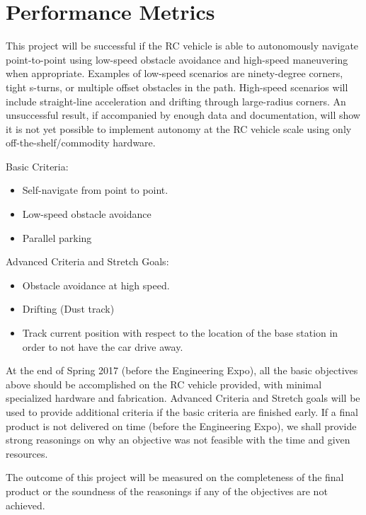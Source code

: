 \documentclass[draftclsnofoot,onecolumn,10pt]{IEEEtran}
\begin{document}
\section{Performance Metrics}
This project will be successful if the RC vehicle is able to autonomously navigate point-to-point using low-speed obstacle avoidance and high-speed maneuvering when appropriate. 
Examples of low-speed scenarios are ninety-degree corners, tight s-turns, or multiple offset obstacles in the path. 
High-speed scenarios will include straight-line acceleration and drifting through large-radius corners. 
An unsuccessful result, if accompanied by enough data and documentation, will show it is not yet possible to implement autonomy at the RC vehicle scale using only off-the-shelf/commodity hardware.\par
Basic Criteria:
\begin{itemize}
	\item Self-navigate from point to point.
	\item Low-speed obstacle avoidance
	\item Parallel parking
\end{itemize}
 Advanced Criteria and Stretch Goals:
 \begin{itemize}
	\item Obstacle avoidance at high speed.
	\item Drifting (Dust track) 
	\item Track current position with respect to the location of the base station in
		order to not have the car drive away.
\end{itemize}
At the end of Spring 2017 (before the Engineering Expo), all the basic objectives above should be accomplished on the RC vehicle provided, with minimal specialized hardware and fabrication. 
Advanced Criteria and Stretch goals will be used to provide additional criteria if the basic criteria are finished early.
If a final product is not delivered on time (before the Engineering Expo), we shall provide strong reasonings on why an objective was not feasible with the time and given resources.

The outcome of this project will be measured on the completeness of the final product or the soundness of the reasonings if any of the objectives are not achieved.
\end{document}
